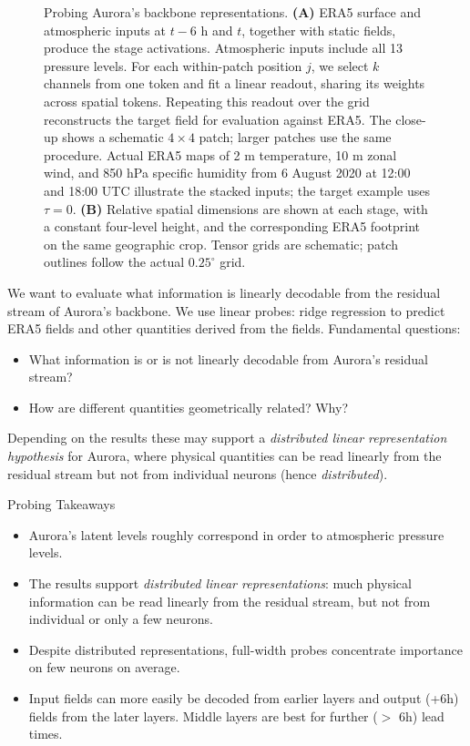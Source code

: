 \documentclass{article}
\theoremstyle{plain}
\theoremstyle{definition}
\begin{document}
\begin{figure}[t!]
  \centering
  \resizebox{\textwidth}{!}{%
    \hspace{5mm}%
  }
  \caption{Probing Aurora's backbone representations. \textbf{(A)} ERA5 surface and atmospheric inputs at $t-6$ h and $t$, together with static fields, produce the stage activations. Atmospheric inputs include all 13 pressure levels. For each within-patch position $j$, we select $k$ channels from one token and fit a linear readout, sharing its weights across spatial tokens. Repeating this readout over the grid reconstructs the target field for evaluation against ERA5. The close-up shows a schematic $4\times4$ patch; larger patches use the same procedure. Actual ERA5 maps of 2 m temperature, 10 m zonal wind, and 850 hPa specific humidity from 6 August 2020 at 12:00 and 18:00 UTC illustrate the stacked inputs; the target example uses $\tau=0$. \textbf{(B)} Relative spatial dimensions are shown at each stage, with a constant four-level height, and the corresponding ERA5 footprint on the same geographic crop. Tensor grids are schematic; patch outlines follow the actual $0.25^\circ$ grid.}
  \label{fig:probing-setup}
\end{figure}

We want to evaluate what information is linearly decodable from the residual stream of Aurora's backbone. We use linear probes: ridge regression \citep{hoerl1970ridge} to predict ERA5 fields and other quantities derived from the fields. Fundamental questions:
\begin{itemize}
  \item What information is or is not linearly decodable from Aurora's residual stream?
  \item How are different quantities geometrically related? Why?
\end{itemize}
Depending on the results these may support a \textit{distributed linear representation hypothesis} for Aurora, where physical quantities can be read linearly from the residual stream but not from individual neurons (hence \textit{distributed}).

\begin{greenbox}{Probing Takeaways}
  \begin{itemize}[leftmargin=*, labelindent=0pt]
    \item Aurora's latent levels roughly correspond in order to atmospheric pressure levels.
    \item The results support \textit{distributed linear representations}: much physical information can be read linearly from the residual stream, but not from individual or only a few neurons.
    \item Despite distributed representations, full-width probes concentrate importance on few neurons on average.
    \item Input fields can more easily be decoded from earlier layers and output (+6h) fields from the later layers. Middle layers are best for further ($>$ 6h) lead times.
  \end{itemize}
\end{greenbox}
\end{document}
